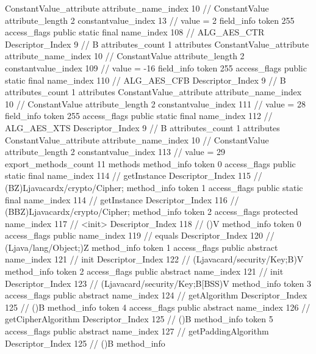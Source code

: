 {{{{{{				ConstantValue_attribute {
					attribute_name_index	10		// ConstantValue
					attribute_length	2
					constantvalue_index	13		// value = 2
				}
				}
			}
			field_info {
				token	255
				access_flags	public static final
				name_index	108		// ALG_AES_CTR
				Descriptor_Index	9		// B
				attributes_count	1
				attributes {
				ConstantValue_attribute {
					attribute_name_index	10		// ConstantValue
					attribute_length	2
					constantvalue_index	109		// value = -16
				}
				}
			}
			field_info {
				token	255
				access_flags	public static final
				name_index	110		// ALG_AES_CFB
				Descriptor_Index	9		// B
				attributes_count	1
				attributes {
				ConstantValue_attribute {
					attribute_name_index	10		// ConstantValue
					attribute_length	2
					constantvalue_index	111		// value = 28
				}
				}
			}
			field_info {
				token	255
				access_flags	public static final
				name_index	112		// ALG_AES_XTS
				Descriptor_Index	9		// B
				attributes_count	1
				attributes {
				ConstantValue_attribute {
					attribute_name_index	10		// ConstantValue
					attribute_length	2
					constantvalue_index	113		// value = 29
				}
				}
			}
			}
			export_methods_count	11
			methods {
				method_info {
					token	0
					access_flags	public static final
					name_index	114		// getInstance
					Descriptor_Index	115		// (BZ)Ljavacardx/crypto/Cipher;
				}
				method_info {
					token	1
					access_flags	public static final
					name_index	114		// getInstance
					Descriptor_Index	116		// (BBZ)Ljavacardx/crypto/Cipher;
				}
				method_info {
					token	2
					access_flags	protected
					name_index	117		// <init>
					Descriptor_Index	118		// ()V
				}
				method_info {
					token	0
					access_flags	public
					name_index	119		// equals
					Descriptor_Index	120		// (Ljava/lang/Object;)Z
				}
				method_info {
					token	1
					access_flags	public abstract
					name_index	121		// init
					Descriptor_Index	122		// (Ljavacard/security/Key;B)V
				}
				method_info {
					token	2
					access_flags	public abstract
					name_index	121		// init
					Descriptor_Index	123		// (Ljavacard/security/Key;B[BSS)V
				}
				method_info {
					token	3
					access_flags	public abstract
					name_index	124		// getAlgorithm
					Descriptor_Index	125		// ()B
				}
				method_info {
					token	4
					access_flags	public abstract
					name_index	126		// getCipherAlgorithm
					Descriptor_Index	125		// ()B
				}
				method_info {
					token	5
					access_flags	public abstract
					name_index	127		// getPaddingAlgorithm
					Descriptor_Index	125		// ()B
				}
				method_info {
}}}}}
